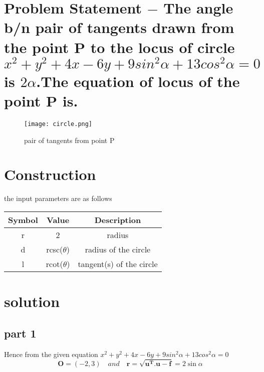 \documentclass[10pt, a4paper]{article}
\title{\mytitle}
\author{\myauthor\hspace{1em}\\\contact\\FWC22069\hspace{6.5em}IITH\hspace{0.5em}\mymodule\hspace{6em}ASSIGN-5}
\date{}
\let\vec\mathbf
\begin{document}
	\maketitle
\section{\large{\textbf{Problem Statement} $-$ The angle b/n pair of tangents drawn from the point P to the locus of circle $x^2+y^2+4x-6y+9sin^2\alpha+13cos^2\alpha=0$ is $2\alpha$.The equation of locus of the point P is.}}
\begin{figure}[h]
\centering
\texttt{[image: circle.png]}
\caption{pair of tangents from point P}
\end{figure}
	\section*{Construction}
\vspace{2mm}
 the input parameters are as follows
{
\setlength\extrarowheight{4pt}
 
 \begin{tabular}{|c|c|c|}
	\hline
	\textbf{Symbol}&\textbf{Value}&\textbf{Description}\\
	\hline
 r&2
	&radius \\
	\hline
 d&rcsc($\theta$)
	&radius of the circle\\
	\hline
l&rcot($\theta$)&tangent(s) of the circle\\
\hline
 \end{tabular}
}
\section*{\large solution}

\subsection*{\large part 1}
Hence from the given equation $x^2+y^2+4x-6y+9sin^2\alpha+13cos^2\alpha=0$\\
\begin{equation}
\vec{O}=(-2,3)\hspace{1em} and \hspace{1em}\vec{r}=\vec{\sqrt{u^T.u-f}}=2\sin\alpha
\end{equation}
\end{document}
